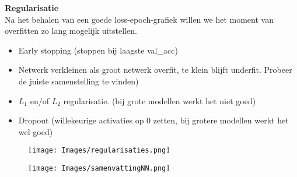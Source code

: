 {\textbf{Regularisatie}\\
Na het behalen van een goede loss-epoch-grafiek willen we het moment van overfitten zo lang mogelijk uitstellen. 
\begin{itemize}
    \item Early stopping (stoppen bij laagste val\_acc)
    \item Netwerk verkleinen als groot netwerk overfit, te klein blijft underfit. Probeer de juiste samenstelling te vinden)
    \item $L_1$ en/of $L_2$ regularisatie. (bij grote modellen werkt het niet goed)
    \item Dropout (willekeurige activaties op 0 zetten, bij grotere modellen werkt het wel goed)
\end{itemize}
\begin{figure}[h]
    \centering
    \texttt{[image: Images/regularisaties.png]}
    \caption*{}
    \label{fig:regularisatie}
\end{figure}
\begin{figure}[h!]
    \centering
    \texttt{[image: Images/samenvattingNN.png]}
    \caption*{}
    \label{fig:samenvatting}
\end{figure}
}

